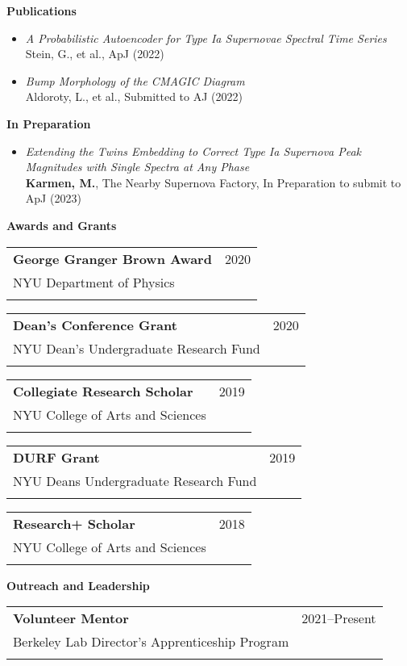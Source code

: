 \documentclass[letterpaper,10pt]{article}
\makeatletter
\newcounter{descounter}
\newcommand{\resetcounter}[0]{\setcounter{descounter}{0}}
\newcommand{\resheading}[1]{\resetcounter \vspace{15pt} {\Large \textbf{#1}} \\ \vspace{-8pt}
    \hrulefill\vspace{5pt}}
\newcommand{\ressubheading}[5]{
    \vspace{10pt}
    \begin{tabular*}{7.0in}{l@{\extracolsep{\fill}}r}
        \textbf{#1} & #2 \\
        #3 & #4 \\
        #5 & \\
    \end{tabular*}\vspace{-5pt}
}
\newcommand{\descheader}[1]{\textbf{#1}}
\makeatother
\begin{document}
\resheading{Publications}

\begin{itemize}
        \item{ \textit{A Probabilistic Autoencoder for Type Ia Supernovae Spectral Time Series} \\Stein, G., et al., ApJ (2022) }
        
        \item{\textit{Bump Morphology of the CMAGIC Diagram} \\ Aldoroty, L., et al., Submitted to AJ (2022)}

\end{itemize}

\descheader{In Preparation}
    
    \begin{itemize}
    
        \item{ \textit{Extending the Twins Embedding to Correct Type Ia Supernova Peak Magnitudes with Single Spectra at Any Phase} \\ \textbf{Karmen, M.}, The Nearby Supernova Factory, In Preparation to submit to ApJ (2023) }
        \vspace{-5pt}
        
    \end{itemize}

\clearpage

\resheading{Awards and Grants}
    
    \ressubheading{George Granger Brown Award}{2020}{NYU Department of Physics}{}{}{}
    
    \vspace{-0.15in}
    \ressubheading{Dean's Conference Grant}{2020}{NYU Dean's Undergraduate Research Fund}{}{}{}
    
    \vspace{-0.15in}
    \ressubheading{Collegiate Research Scholar}{2019}{NYU College of Arts and Sciences}{}{}{}
    
    \vspace{-0.15in}
    \ressubheading{DURF Grant}{2019}{NYU Deans Undergraduate Research Fund}{}{}{}
    
    \vspace{-0.15in}
    \ressubheading{Research+ Scholar}{2018}{NYU College of Arts and Sciences}{}{}{}
    \vspace{-0.15in}

\resheading{Outreach and Leadership}

    \ressubheading{Volunteer Mentor}{2021--Present}{Berkeley Lab Director's Apprenticeship Program}{}{}
    \vspace{-0.15in}
    
\end{document}
